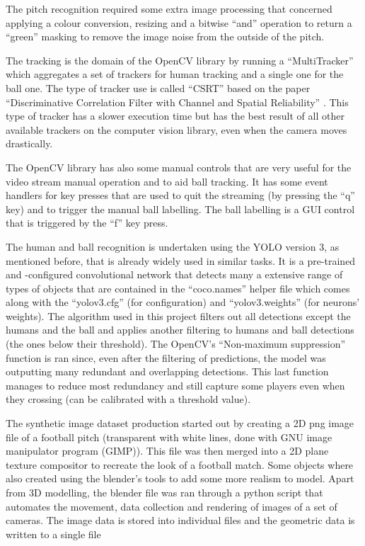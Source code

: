 \documentclass[
    11pt,
    twoside
]{report}
\begin{document}
The pitch recognition required some extra image processing that concerned applying a colour conversion, resizing and a bitwise ``and'' operation to return a ``green'' masking to remove the image noise from the outside of the pitch.


The tracking is the domain of the OpenCV library by running a ``MultiTracker'' which aggregates a set of trackers for human tracking and a single one for the ball one. The type of tracker use is called ``CSRT'' based on the paper ``Discriminative Correlation Filter with Channel and Spatial Reliability'' \cite{csrt}. This type of tracker has a slower execution time but has the best result of all other available trackers on the computer vision library, even when the camera moves drastically.


The OpenCV library has also some manual controls that are very useful for the video stream manual operation and to aid ball tracking. It has some event handlers for key presses that are used to quit the streaming (by pressing the ``q'' key) and to trigger the manual ball labelling. The ball labelling is a GUI control that is triggered by the ``f'' key press.


The human and ball recognition is undertaken using the YOLO version 3, as mentioned before, that is already widely used in similar tasks. It is a pre-trained and -configured convolutional network that detects many a extensive range of types of objects that are contained in the ``coco.names'' helper file which comes along with the ``yolov3.cfg'' (for configuration) and ``yolov3.weights'' (for neurons' weights). The algorithm used in this project filters out all detections except the humans and the ball and applies another filtering to humans and ball detections (the ones below their threshold). The OpenCV's ``Non-maximum suppression'' \cite{nms} function is ran since, even after the filtering of predictions, the model was outputting many redundant and overlapping detections. This last function manages to reduce most redundancy and still capture some players even when they crossing (can be calibrated with a threshold value).


The synthetic image dataset production started out by creating a 2D png image file of a football pitch (transparent with white lines, done with GNU image manipulator program (GIMP)). This file was then merged into a 2D plane texture compositor to recreate the look of a football match. Some objects where also created using the blender's tools to add some more realism to model. Apart from 3D modelling, the blender file was ran through a python script that automates the movement, data collection and rendering of images of a set of cameras. The image data is stored into individual files and the geometric data is written to a single file
\end{document}
